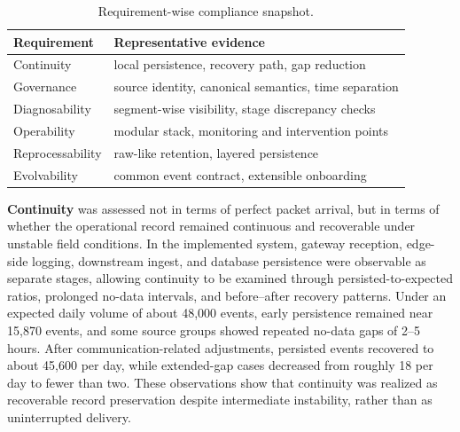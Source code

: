 \documentclass[systems,article,submit,pdftex,moreauthors]{Definitions/mdpi}
\begin{document}
\begin{table}[H]
\caption{Requirement-wise compliance snapshot.\label{tab:requirement_compliance_snapshot}}
\renewcommand{\arraystretch}{1.25}
\begin{tabularx}{\textwidth}{
>{\raggedright\arraybackslash}p{}
>{\raggedright\arraybackslash}X}
\toprule
\textbf{Requirement} & \textbf{Representative evidence} \\
\midrule

Continuity
& local persistence, recovery path, gap reduction \\

Governance
& source identity, canonical semantics, time separation \\

Diagnosability
& segment-wise visibility, stage discrepancy checks \\

Operability
& modular stack, monitoring and intervention points \\

Reprocessability
& raw-like retention, layered persistence \\

Evolvability
& common event contract, extensible onboarding \\

\bottomrule
\end{tabularx}
\renewcommand{\arraystretch}{1.0}
\end{table}



\textbf{Continuity} was assessed not in terms of perfect packet arrival, but in terms of whether the operational record remained continuous and recoverable under unstable field conditions. In the implemented system, gateway reception, edge-side logging, downstream ingest, and database persistence were observable as separate stages, allowing continuity to be examined through persisted-to-expected ratios, prolonged no-data intervals, and before--after recovery patterns. Under an expected daily volume of about 48{,}000 events, early persistence remained near 15{,}870 events, and some source groups showed repeated no-data gaps of 2--5 hours. After communication-related adjustments, persisted events recovered to about 45{,}600 per day, while extended-gap cases decreased from roughly 18 per day to fewer than two. These observations show that continuity was realized as recoverable record preservation despite intermediate instability, rather than as uninterrupted delivery.
\end{document}
